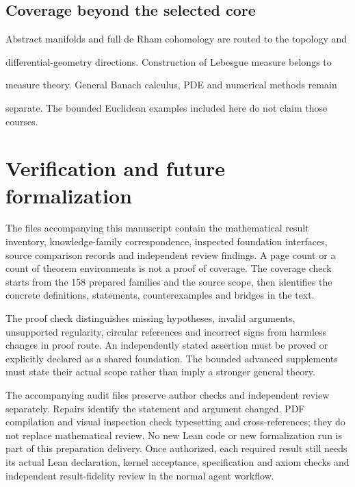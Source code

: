 \documentclass[11pt,oneside,openany]{book}
\theoremstyle{definition}
\theoremstyle{remark}
\newcounter{foundation}
\begin{document}
\section*{Coverage beyond the selected core}

Abstract manifolds and full de Rham cohomology are routed to the topology and

differential-geometry directions. Construction of Lebesgue measure belongs to

measure theory. General Banach calculus, PDE and numerical methods remain

separate. The bounded Euclidean examples included here do not claim those courses.



\chapter*{Verification and future formalization}
The files accompanying this manuscript contain the mathematical result
inventory, knowledge-family correspondence, inspected foundation interfaces,
source comparison records and independent review findings. A page count or a
count of theorem environments is not a proof of coverage. The coverage check
starts from the 158 prepared families and the source scope, then identifies
the concrete definitions, statements, counterexamples and bridges in the text.

The proof check distinguishes missing hypotheses, invalid arguments, unsupported
regularity, circular references and incorrect signs from harmless changes in
proof route. An independently stated assertion must be proved or explicitly
declared as a shared foundation. The bounded advanced supplements must state
their actual scope rather than imply a stronger general theory.

The accompanying audit files preserve author checks and independent review
separately. Repairs identify the statement and argument changed. PDF compilation
and visual inspection check typesetting and cross-references; they do not
replace mathematical review. No new Lean code or new formalization run is part
of this preparation delivery. Once authorized, each required result still
needs its actual Lean declaration, kernel acceptance, specification and axiom
checks and independent result-fidelity review in the normal agent workflow.

\end{document}
